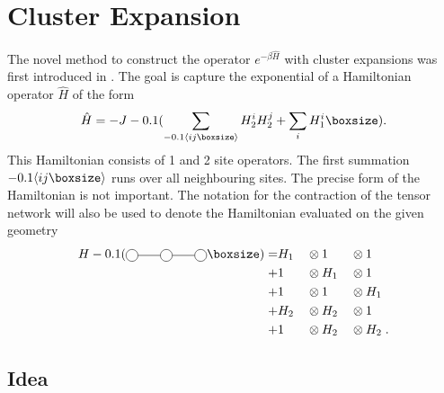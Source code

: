 \documentclass[twocolumn]{article}
\newcounter{a}
\newcounter{b}
\begin{document}

\section{Cluster Expansion}

The novel method to construct the operator $e^{-\beta \hat{H}}$ with cluster expansions was first introduced in \cite{Vanhecke2021}. The goal is capture the exponential of a Hamiltonian operator $\hat{H}$ of the form
\begin{equation}\label{H_eq}
    \hat{H} = -J \left (  \sum_{  \Braket{i j }} H^i_2 H^j_2 + \sum_i H^i_1 \right ) .
\end{equation}
This Hamiltonian consists of 1 and 2 site operators. The first summation $\Braket{i j }$ runs over all neighbouring sites. The precise form of the Hamiltonian is not important. The notation for the contraction of the tensor network will also be used to denote the Hamiltonian evaluated on the given geometry
\begin{alignat}{3}
    H \left( \mpob{3}{ {0,,,0}  }{}{}{}{{"",,}} \right ) = & H_1 &  & \otimes 1   &  & \otimes 1  \nonumber  \\
    +                                                      & 1   &  & \otimes H_1 &  & \otimes 1 \nonumber   \\
    +                                                      & 1   &  & \otimes 1   &  & \otimes H_1 \nonumber \\
    +                                                      & H_2 &  & \otimes H_2 &  & \otimes 1   \nonumber \\
    +                                                      & 1   &  & \otimes H_2 &  & \otimes H_2  \; .
\end{alignat}

\subsection{Idea}
\end{document}
